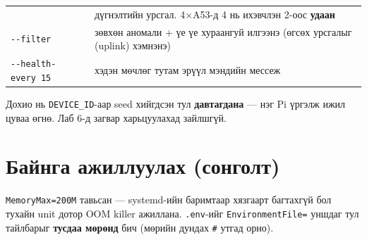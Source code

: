 \begin{longtable}[]{@{}ll@{}}
\begin{minipage}[t]{0.47\columnwidth}
\end{minipage} & \begin{minipage}[t]{0.47\columnwidth}\raggedright
дүгнэлтийн урсгал. 4×A53-д 4 нь ихэвчлэн 2-оос \textbf{удаан}\strut
\end{minipage}\tabularnewline
\begin{minipage}[t]{0.47\columnwidth}\raggedright
\texttt{-\/-filter}\strut
\end{minipage} & \begin{minipage}[t]{0.47\columnwidth}\raggedright
зөвхөн аномали + үе үе хураангуй илгээнэ (өгсөх урсгалыг (uplink) хэмнэнэ)\strut
\end{minipage}\tabularnewline
\begin{minipage}[t]{0.47\columnwidth}\raggedright
\texttt{-\/\allowbreak{}-health-every\ 15}\strut
\end{minipage} & \begin{minipage}[t]{0.47\columnwidth}\raggedright
хэдэн мөчлөг тутам эрүүл мэндийн мессеж\strut
\end{minipage}\tabularnewline
\bottomrule
\end{longtable}\endgroup

Дохио нь \texttt{DEVICE\_ID}-аар seed хийгдсэн тул \textbf{давтагдана} --- нэг Pi үргэлж ижил цуваа өгнө. Лаб 6-д загвар харьцуулахад зайлшгүй.

\hypertarget{ux431ux430ux439ux43dux433ux430-ux430ux436ux438ux43bux43bux443ux443ux43bux430ux445-ux441ux43eux43dux433ux43eux43bux442}{%
\section{Байнга ажиллуулах (сонголт)}\label{ux431ux430ux439ux43dux433ux430-ux430ux436ux438ux43bux43bux443ux443ux43bux430ux445-ux441ux43eux43dux433ux43eux43bux442}}

\begin{Shaded}
\begin{Highlighting}[]
\end{Highlighting}
\end{Shaded}

\texttt{MemoryMax=200M} тавьсан --- systemd-ийн баримтаар хязгаарт багтахгүй бол тухайн unit дотор OOM killer ажиллана. \texttt{.env}-ийг \texttt{EnvironmentFile=} уншдаг тул тайлбарыг \textbf{тусдаа мөрөнд} бич (мөрийн дундах \texttt{\#} утгад орно).

